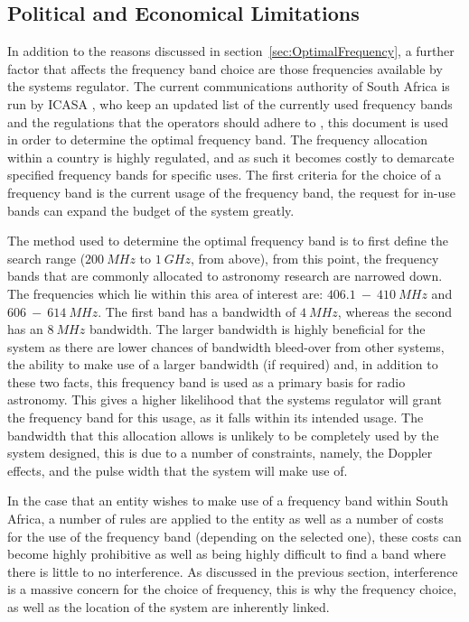 \documentclass[11pt]{witseiepaper}
\begin{document}
\begin{bibunit}[witseie]
\subsection{Political and Economical Limitations} \label{sec:PoliticalandEconomicalLimitations}
In addition to the reasons discussed in section~\ref{sec:OptimalFrequency}, a further factor that affects the frequency band choice are those frequencies available by the systems regulator. The current communications authority of South Africa is run by ICASA \cite{ICASA}, who keep an updated list of the currently used frequency bands and the regulations that the operators should adhere to \cite{frequencyAllocation}, this document is used in order to determine the optimal frequency band.
The frequency allocation within a country is highly regulated, and as such it becomes costly to demarcate specified frequency bands for specific uses.
The first criteria for the choice of a frequency band is the current usage of the frequency band, the request for in-use bands can expand the budget of the system greatly.

The method used to determine the optimal frequency band is to first define the search range ($200~MHz$ to $1~GHz$, from above), from this point, the frequency bands that are commonly allocated to astronomy research are narrowed down. The frequencies which lie within this area of interest are: $406.1~-~410~MHz$ and $606~-~614~MHz$. 
The first band has a bandwidth of $4~MHz$, whereas the second has an $8~MHz$ bandwidth. The larger bandwidth is highly beneficial for the system as there are lower chances of bandwidth bleed-over from other systems, the ability to make use of a larger bandwidth (if required) and, in addition to these two facts, this frequency band is used as a primary basis for radio astronomy.
This gives a higher likelihood that the systems regulator will grant the frequency band for this usage, as it falls within its intended usage.
The bandwidth that this allocation allows is unlikely to be completely used by the system designed, this is due to a number of constraints, namely, the Doppler effects, and the pulse width that the system will make use of.

In the case that an entity wishes to make use of a frequency band within South Africa, a number of rules are applied to the entity as well as a number of costs for the use of the frequency band (depending on the selected one), these costs can become highly prohibitive as well as being highly difficult to find a band where there is little to no interference.
As discussed in the previous section, interference is a massive concern for the choice of frequency, this is why the frequency choice, as well as the location of the system are inherently linked.



\end{bibunit}
\end{document}

